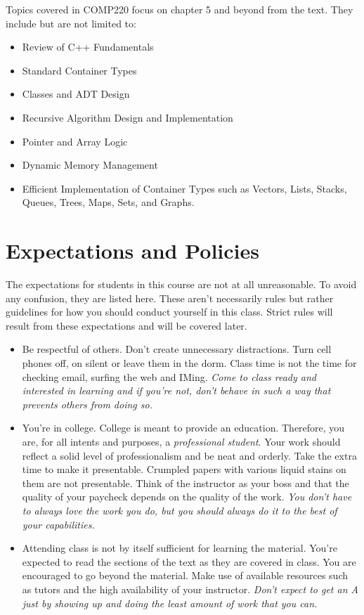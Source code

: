 \documentclass[10pt]{article}
\begin{document}
Topics covered in COMP220 focus on chapter 5 and beyond from the text. They include but are not limited to:
\begin{itemize}
\item Review of C++ Fundamentals
\item Standard Container Types
\item Classes and ADT Design
\item Recursive Algorithm Design and Implementation
\item Pointer and Array Logic
\item Dynamic Memory Management
\item Efficient Implementation of Container Types such as Vectors, Lists, Stacks, Queues, Trees, Maps, Sets, and Graphs.
\end{itemize}

   
\section{Expectations and Policies}
The expectations for students in this course are not at all unreasonable.  To avoid any confusion, they are listed here.  These aren't necessarily rules but rather guidelines for how you should conduct yourself in this class.  Strict rules will result from these expectations and will be covered later.
\begin{itemize}
\item Be respectful of others.  Don't create unnecessary distractions.  Turn cell phones off, on silent or leave them in the dorm.  Class time is not the time for checking email, surfing the web and IMing.  \textit{Come to class ready and interested in learning and if you're not, don't behave in such a way that prevents others from doing so.}
\item You're in college.  College is meant to provide an education.  Therefore, you are, for all intents and purposes, a \textit{professional student}.  Your work should reflect a solid level of professionalism and be neat and orderly.  Take the extra time to make it presentable.  Crumpled papers with various liquid stains on them are not presentable.  Think of the instructor as your boss and that the quality of your paycheck depends on the quality of the work.  \textit{You don't have to always love the work you do, but you should always do it to the best of your capabilities.}
\item Attending class is not by itself sufficient for learning the material.  You're expected to read the sections of the text as they are covered in class.  You are encouraged to go beyond the material.  Make use of available resources such as tutors and the high availability of your instructor.  \textit{Don't expect to get an A just by showing up and doing the least amount of work that you can.}
\end{itemize}
\end{document}
